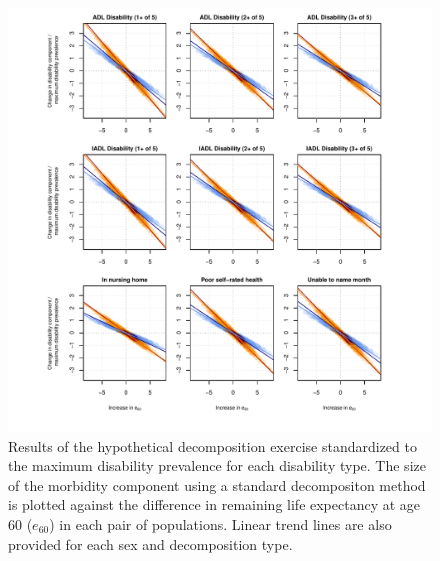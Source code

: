 \documentclass[11pt,oneside,a4paper]{article} %
\begin{document}
\begin{figure}
\begin{adjustwidth}{-1.5cm}{}
	\centering
	\includegraphics[scale=.8]{Figures/Decomp_3x3_rel.pdf}
	\caption{Results of the hypothetical decomposition exercise standardized to the maximum disability prevalence for each disability type. The size of the
	morbidity component using a standard decompositon method is plotted against
	the difference in remaining life expectancy at age 60 ($e_{60}$) in each
	pair of populations. Linear trend lines are also provided for each sex and decomposition type.}
	\label{fig:Fig_Decomp_3x3_rel}
\end{adjustwidth}
\end{figure}



\newpage%


\end{document}
